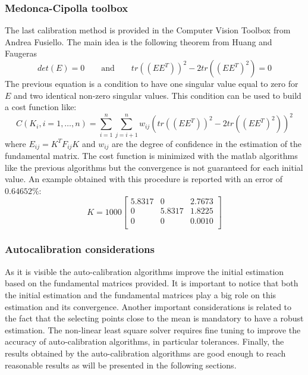 \documentclass[11pt]{article}
\begin{document}
\subsubsection{Medonca-Cipolla toolbox}
The last calibration method is provided in the Computer Vision Toolbox from Andrea Fusiello. The main idea is the following theorem from Huang and Faugeras \cite{Faugeras89}
\begin{equation}
    det(E) = 0 \qquad \text{and} \qquad tr((EE^T))^2 - 2 tr((EE^T)^2) = 0
\end{equation}
The previous equation is a condition to have one singular value equal to zero for $E$ and two identical non-zero singular values. This condition can be used to build a cost function like:
\begin{equation}
    C(K_i, i = 1,\dots, n) = \sum_{i=1}^{n} \sum_{j=i+1}^{n} w_{ij} (tr((EE^T))^2 - 2 tr((EE^T)^2))^2
\end{equation}
where $E_{ij} = K^TF_{ij}K$ and $w_{ij}$ are the degree of confidence in the estimation of the fundamental matrix. The cost function is minimized with the matlab algorithms like the previous algorithms but the convergence is not guaranteed for each initial value. An example obtained with this procedure is reported with an error of $0.64652\%$:
\begin{equation}
    K = 1000 \begin{bmatrix}
     5.8317  &       0   & 2.7673\\
          0  &  5.8317   & 1.8225\\
          0  &       0   & 0.0010\\ 
\end{bmatrix}
\end{equation}

\bigskip
\subsubsection{Autocalibration considerations}
As it is visible the auto-calibration algorithms improve the initial estimation based on the fundamental matrices provided. It is important to notice that both the initial estimation and the fundamental matrices play a big role on this estimation and its convergence. Another important considerations is related to the fact that the selecting points close to the mean is mandatory to have a robust estimation. The non-linear least square solver requires fine tuning to improve the accuracy of auto-calibration algorithms, in particular tolerances. Finally, the results obtained by the auto-calibration algorithms are good enough to reach reasonable results as will be presented in the following sections.
\end{document}
